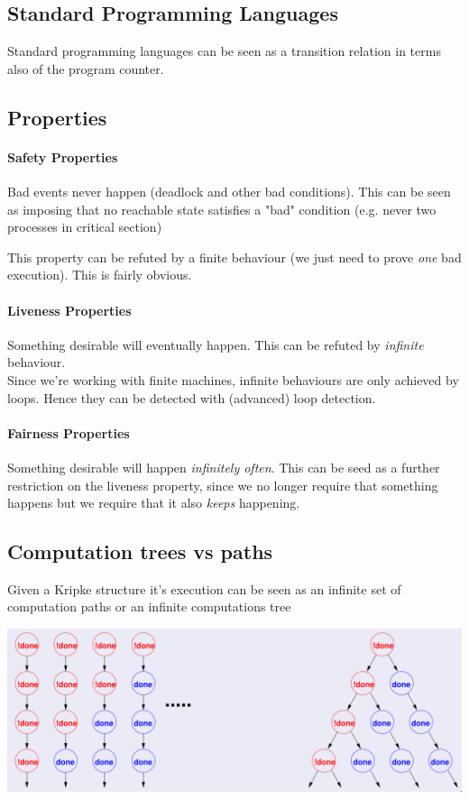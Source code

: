 \documentclass{article}
\begin{document}
\subsection{Standard Programming Languages}
Standard programming languages can be seen as a transition relation in terms also of the program counter.

\subsection{Properties}
\paragraph{Safety Properties}
Bad events never happen (deadlock and other bad conditions). This can be seen as imposing that no reachable state satisfies a "bad" condition (e.g. never two processes in critical section)

This property can be refuted by a finite behaviour (we just need to prove \textit{one} bad execution). This is fairly obvious.

\paragraph{Liveness Properties}
Something desirable will eventually happen. This can be refuted by \textit{infinite} behaviour.\\
Since we're working with finite machines, infinite behaviours are only achieved by loops. Hence they can be detected with (advanced) loop detection.

\paragraph{Fairness Properties}
Something desirable will happen \textit{infinitely often}. This can be seed as a further restriction on the liveness property, since we no longer require that something happens but we require that it also \textit{keeps} happening.

\subsection{Computation trees vs paths}
Given a Kripke structure it's execution can be seen as an infinite set of computation paths or an infinite computations tree
\begin{center}
    \includegraphics[width=0.8\linewidth]{images/pathVsTree.png}
\end{center}
\end{document}
